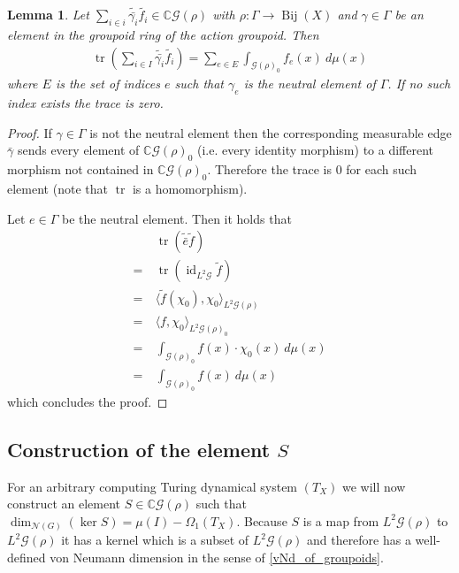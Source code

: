 \documentclass[12pt,a4paper]{scrartcl}
\theoremstyle{plain}
\newtheorem{Lemma}[Theorem]{Lemma}
\theoremstyle{definition}
\numberwithin{equation}{section}
\newcommand{\C}{\mathbb{C}} %
\newcommand{\2}{\mathbb{Z} / 2 \mathbb{Z}}
\newcommand{\G}{\mathcal{G}}
\newcommand{\1}{\bar{1}}
\newcommand{\0}{\bar{0}}
\newcommand{\Bij}{\operatorname{Bij}}
\newcommand{\tr}{\operatorname{tr}}
\newcommand{\id}{\operatorname{id}}
\begin{document}
\begin{Lemma} \label{trgroupoid}
	Let $\sum_{i \in i} \tilde{\bar{\gamma_i}} \tilde{f_i} \in \C\G(\rho)$ with $\rho\colon\Gamma \to \Bij(X)$ and $\gamma \in \Gamma$ be an element in the groupoid ring of the action groupoid. Then
	\begin{align*}
	\tr(\sum_{i \in I} \tilde{\bar{\gamma_i}} \tilde{f_i}) = \sum_{e \in E} \int_{\G(\rho)_0} f_e(x) ~ d\mu(x)
	\end{align*}
	where $E$ is the set of indices $e$ such that $\gamma_e$ is the neutral element of $\Gamma$. If no such index exists the trace is zero.
\end{Lemma}
\begin{proof} 
	If $\gamma \in \Gamma$ is not the neutral element then the corresponding measurable edge $\bar{\gamma}$ sends every element of $\C\G(\rho)_0$ (i.e. every identity morphism) to a different morphism not contained in $\C\G(\rho)_0$. Therefore the trace is $0$ for each such element (note that $\tr$ is a homomorphism).
	
	Let $e \in \Gamma$ be the neutral element. Then it holds that
	\begin{align*}
	&~ \tr(\tilde{\bar{e}} \tilde{f}) \\
	=&~ \tr(\id_{L^2 \G} \tilde{f}) \\
	=&~ \langle \tilde{f} (\chi_0), \chi_0 \rangle_{L^2 \G(\rho)} \\
	=&~ \langle f, \chi_0 \rangle_{L^2 \G(\rho)_0} \\
	=&~ \int_{\G(\rho)_0} f(x) \cdot \chi_0(x) ~ d\mu(x) \\
	=&~ \int_{\G(\rho)_0} f(x) ~ d\mu(x)
	\end{align*}
	which concludes the proof.
\end{proof}


\subsection{Construction of the element $S$}
For an arbitrary computing Turing dynamical system $(T_X)$ we will now construct an element $S \in \C \G (\rho)$ such that $\dim_{\mathcal{N}(G)}(\ker S) = \mu(I) - \Omega_1(T_X)$. Because $S$ is a map from $L^2 \G (\rho)$ to $L^2 \G (\rho)$ it has a kernel which is a subset of $L^2 \G (\rho)$ and therefore has a well-defined von Neumann dimension in the sense of \ref{vNd_of_groupoids}.
\end{document}
